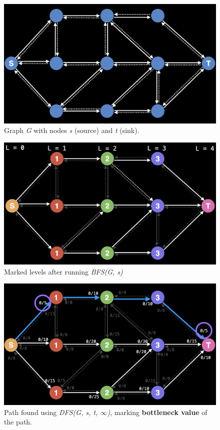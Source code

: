 \documentclass{report}
\begin{document}
\begin{figure}[!htb]
    \includegraphics[width=\textwidth]{assets/visual01.png}
    \centering
    \captionsetup{justification=centering,margin=2cm}
    \caption{Graph \textit{G} with nodes \textit{s} (source) and \textit{t} (sink).}
\end{figure}
\begin{figure}[!htb]
    \includegraphics[width=\textwidth]{assets/visual02.png}
    \centering
    \captionsetup{justification=centering,margin=2cm}
    \caption{Marked levels after running \textit{BFS(G, s)}}
\end{figure}
\pagebreak
\begin{figure}[!htb]
    \includegraphics[width=\textwidth]{assets/visual03.png}
    \centering
    \captionsetup{justification=centering,margin=2cm}
    \caption{Path found using \textit{DFS(G, s, t, $\infty$)}, marking \textbf{bottleneck value} of the path.}
\end{figure}
\end{document}
